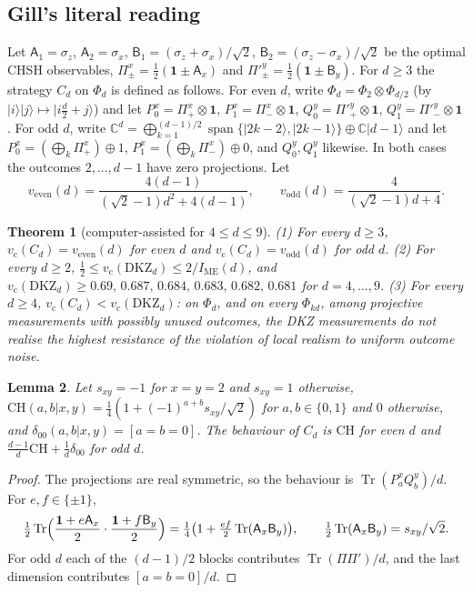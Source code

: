 \documentclass[11pt]{amsart}
\newtheorem{theorem}{Theorem}[section]
\newtheorem{lemma}[theorem]{Lemma}
\theoremstyle{definition}
\theoremstyle{remark}
\numberwithin{equation}{section}
\newcommand{\C}{\mathbb{C}}
\newcommand{\Tr}{\operatorname{Tr}}
\newcommand{\one}{\mathbf{1}}
\newcommand{\IME}{I_{\mathrm{ME}}}
\newcommand{\vc}{v_{\mathrm c}}
\newcommand{\veven}{v_{\mathrm{even}}}
\newcommand{\vodd}{v_{\mathrm{odd}}}
\newcommand{\CH}{\mathrm{CH}}
\newcommand{\DKZ}{\mathrm{DKZ}}
\begin{document}
\subsection{Gill's literal reading}\label{subsec:literal}
Let $\mathsf A_1=\sigma_z$, $\mathsf A_2=\sigma_x$, $\mathsf B_1=(\sigma_z+\sigma_x)/\sqrt2$,
$\mathsf B_2=(\sigma_z-\sigma_x)/\sqrt2$ be the optimal CHSH observables, $\Pi^x_\pm=\frac12(\one\pm\mathsf A_x)$ and
$\Pi'^y_\pm=\frac12(\one\pm\mathsf B_y)$. For $d\ge3$ the strategy $C_d$ on $\Phi_d$ is defined as follows. For even $d$,
write $\Phi_d=\Phi_2\otimes\Phi_{d/2}$ (by $|i\rangle|j\rangle\mapsto|i\frac d2+j\rangle$) and let
$P^x_0=\Pi^x_+\otimes\one$, $P^x_1=\Pi^x_-\otimes\one$, $Q^y_0=\Pi'^y_+\otimes\one$, $Q^y_1=\Pi'^y_-\otimes\one$. For odd
$d$, write $\C^d=\bigoplus_{k=1}^{(d-1)/2}\operatorname{span}\{|2k-2\rangle,|2k-1\rangle\}\oplus\C|d-1\rangle$ and let
$P^x_0=(\bigoplus_k\Pi^x_+)\oplus1$, $P^x_1=(\bigoplus_k\Pi^x_-)\oplus0$, and $Q^y_0,Q^y_1$ likewise. In both cases the
outcomes $2,\dots,d-1$ have zero projections. Let
\[
\veven(d)=\frac{4(d-1)}{(\sqrt2-1)d^2+4(d-1)},\qquad\vodd(d)=\frac4{(\sqrt2-1)d+4}.
\]

\begin{theorem}[computer-assisted for $4\le d\le9$]\label{thm:literal}
(1) For every $d\ge3$, $\vc(C_d)=\veven(d)$ for even $d$ and $\vc(C_d)=\vodd(d)$ for odd $d$. (2) For every $d\ge2$,
$\frac12\le\vc(\DKZ_d)\le2/\IME(d)$, and $\vc(\DKZ_d)\ge0.69,\,0.687,\,0.684,\,0.683,\,0.682,\,0.681$ for $d=4,\dots,9$.
(3) For every $d\ge4$, $\vc(C_d)<\vc(\DKZ_d)$: on $\Phi_d$, and on every $\Phi_{kd}$, among projective measurements
with possibly unused outcomes, the DKZ measurements do not realise the highest resistance of the violation of local
realism to uniform outcome noise.
\end{theorem}

\begin{lemma}\label{lem:Cbeh}
Let $s_{xy}=-1$ for $x=y=2$ and $s_{xy}=1$ otherwise, $\CH(a,b|x,y)=\frac14(1+(-1)^{a+b}s_{xy}/\sqrt2)$ for
$a,b\in\{0,1\}$ and $0$ otherwise, and $\delta_{00}(a,b|x,y)=[a=b=0]$. The behaviour of $C_d$ is $\CH$ for even $d$ and
$\frac{d-1}d\CH+\frac1d\delta_{00}$ for odd $d$.
\end{lemma}

\begin{proof}
The projections are real symmetric, so the behaviour is $\Tr(P^x_aQ^y_b)/d$. For $e,f\in\{\pm1\}$,
\[
\tfrac12\Tr\Bigl(\frac{\one+e\mathsf A_x}2\cdot\frac{\one+f\mathsf B_y}2\Bigr)=\tfrac14\bigl(1+\tfrac{ef}2\Tr(\mathsf A_x\mathsf B_y)\bigr),
\qquad\tfrac12\Tr(\mathsf A_x\mathsf B_y)=s_{xy}/\sqrt2 .
\]
For odd $d$ each of the $(d-1)/2$ blocks contributes $\Tr(\Pi\Pi')/d$, and the last dimension contributes $[a=b=0]/d$.
\end{proof}
\end{document}
